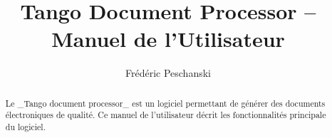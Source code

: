 
\title{Tango Document Processor -- Manuel de l'Utilisateur}

\author{Frédéric Peschanski}


\begin{abstract}
Le _Tango document processor_ est un logiciel permettant de générer des documents électroniques de qualité. Ce manuel de l'utilisateur décrit les fonctionnalités principale du logiciel.
\end{abstract}




